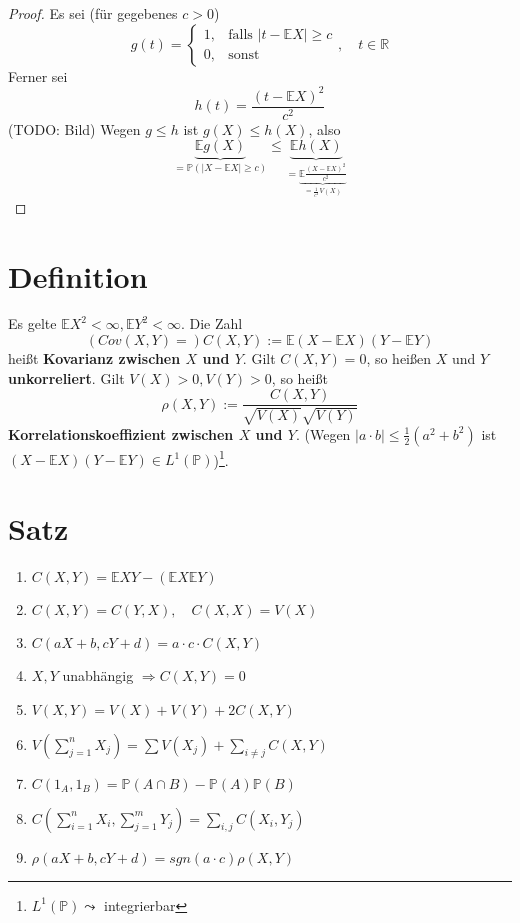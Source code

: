 \documentclass[a4paper,11pt,notitlepage]{report}
\newcommand{\R}{{\ensuremath{\mathbb{R}}}}
\newcommand{\Prim}{{\ensuremath{\mathbb{P}}}}
\newcommand{\E}{{\ensuremath{\mathbb{E}}}}
\begin{document}
\begin{proof}
	Es sei (für gegebenes $c>0$)
	$$g(t) = \begin{cases} 1, & \text{falls } |t - \E X | \geq c \\ 0, & \text{sonst}\end{cases}, \quad t \in \R$$
	Ferner sei 
	$$h(t)= \frac{(t - \E X)^2}{c^2}$$
	(TODO: Bild)
	\newline
	Wegen $g \leq h$ ist $g(X) \leq h(X)$, also
	$$\underbrace{\E g(X)}_{= \Prim(|X - \E X| \geq c)} \leq \underbrace{\E h(X)}_{= \underbrace{\E \frac{(X- \E X)^2}{c^2}}_{= \frac{1}{c^2} V(X)}}$$
\end{proof}

\section{Definition}
Es gelte $\E X^2 < \infty, \E Y^2 < \infty$. Die Zahl
$$(Cov(X,Y)=) C(X,Y) := \E (X - \E X) (Y - \E Y)$$
heißt \textbf{Kovarianz zwischen $X$ und $Y$}.
Gilt $C(X,Y)=0$, so heißen $X$ und $Y$ \textbf{unkorreliert}.
Gilt $V(X)>0, V(Y)>0$, so heißt
$$\rho(X,Y):= \frac{C(X,Y)}{\sqrt{V(X)}\sqrt{V(Y)}}$$
\textbf{Korrelationskoeffizient zwischen $X$ und $Y$}.
(Wegen $|a \cdot b| \leq \frac{1}{2} (a^2 + b^2)$ ist $(X-\E X) (Y - \E Y) \in L^1(\Prim)$)\footnote{$L^1(\Prim) \leadsto$ integrierbar}.

\section{Satz}
\begin{enumerate}
	\item $C(X,Y) = \E X Y - (\E X \E Y)$
	\item $C(X,Y) = C(Y,X), \quad C(X,X)=V(X)$
	\item $C(aX+b,cY+d) = a \cdot c \cdot C(X,Y)$
	\item $X,Y$ unabhängig $\Rightarrow C(X,Y) = 0$
	\item $V(X,Y) = V(X)+ V(Y) + 2 C(X,Y)$
	\item $V(\sum\limits_{j=1}^n{X_j}) = \sum{V(X_j)} + \sum\limits_{i \neq j}{C(X,Y)}$
	\item $C(1_A, 1_B) = \Prim(A \cap B) - \Prim(A) \Prim(B)$
	\item $C(\sum\limits_{i=1}^n{X_i}, \sum\limits_{j=1}^m{Y_j}) = \sum\limits_{i,j}{C(X_i, Y_j)}$
	\item $\rho(aX+b, cY+d) = sgn(a \cdot c)\rho(X,Y)$
\end{enumerate}
\end{document}
